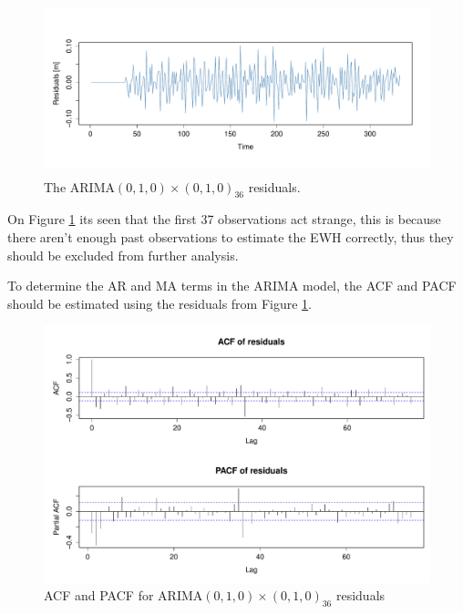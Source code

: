 \begin{figure}[H]
	\centering
	\includegraphics[height=5cm]{figures/ts-residual-i1s1}
	\caption{The ARIMA$(0,1,0) \times (0,1,0)_{36}$ residuals.}
	\label{fig:ts-residual-i1s1}
\end{figure}
On Figure \ref{fig:ts-residual-i1s1} its seen that the first 37 observations act strange, this is because there aren't enough past observations to estimate the EWH correctly, thus they should be excluded from further analysis.

To determine the AR and MA terms in the ARIMA model, the ACF and PACF should be estimated using the residuals from Figure \ref{fig:ts-residual-i1s1}.
\begin{figure}[H]
	\centering
	\includegraphics[width=\textwidth]{figures/ts-acf-ar0s0}
	\caption{ACF and PACF for ARIMA$(0,1,0) \times (0,1,0)_{36}$ residuals}
	\label{fig:ts-acf-ar0s0}
\end{figure}

